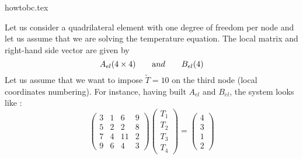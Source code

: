 
\begin{flushright} {\tiny {\color{gray} howtobc.tex}} \end{flushright}

Let us consider a quadrilateral element with one degree of freedom per node and let us assume that we are solving the temperature equation. The local matrix and right-hand side vector are given by 
\[
A_{el}(4\times 4) \quad\quad {\text and} \quad\quad B_{el}(4)
\]
Let us assume that we want to impose $\tilde{T}=10$ on the third node (local coordinates numbering). For instance, having built $A_{el}$ and $B_{el}$, the system looks like :
\[
\left(
\begin{array}{cccc}
3 & 1 & 6  & 9 \\
5 & 2 & 2  & 8 \\
7 & 4 & 11 & 2 \\
9 & 6 & 4  & 3
\end{array}
\right)
\left(
\begin{array}{c}
T_1 \\ T_2 \\ T_3 \\ T_4
\end{array}
\right)
=
\left(
\begin{array}{c}
4 \\ 3 \\ 1 \\ 2
\end{array}
\right)
\]

